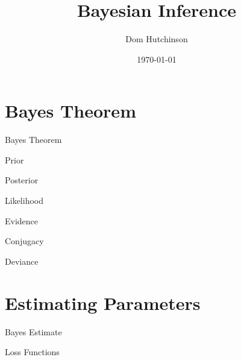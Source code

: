\documentclass[11pt,a4paper]{article}
\begin{document}
\title{Bayesian Inference}
\author{Dom Hutchinson}
\date{\today}
\maketitle


\section{Bayes Theorem}

\begin{theorem}{Bayes Theorem}

\end{theorem}

\begin{remark}{Prior}
\end{remark}

\begin{remark}{Posterior}

\end{remark}

\begin{remark}{Likelihood}

\end{remark}

\begin{remark}{Evidence}

\end{remark}

\begin{definition}{Conjugacy}

\end{definition}

\begin{definition}{Deviance}

\end{definition}

\section{Estimating Parameters}

\begin{definition}{Bayes Estimate}

\end{definition}

\begin{definition}{Loss Functions}
\end{definition}
\end{document}

